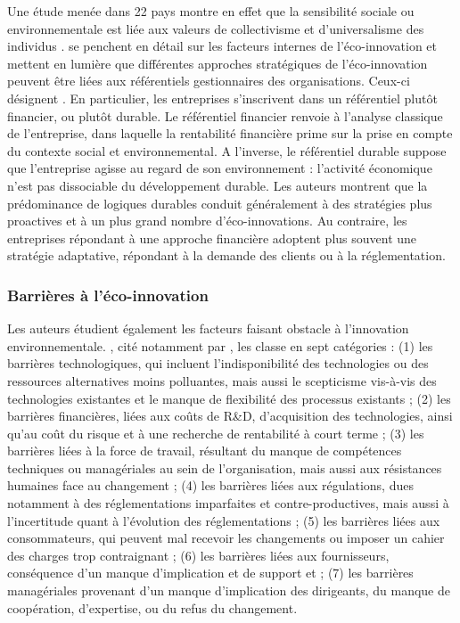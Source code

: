             Une étude menée dans 22 pays montre en effet que la sensibilité sociale ou environnementale est liée aux valeurs de collectivisme et d'universalisme des individus \parencite{reynaud2008les}. \textcite{mathieu2015les} se penchent en détail sur les facteurs internes de l'éco-innovation et mettent en lumière que différentes approches stratégiques de l'éco-innovation peuvent être liées aux référentiels gestionnaires des organisations. Ceux-ci désignent  \parencite{martinet2004entreprise}. En particulier, les entreprises s'inscrivent dans un référentiel plutôt financier, ou plutôt durable. Le référentiel financier renvoie à l'analyse classique de l'entreprise, dans laquelle la rentabilité financière prime sur la prise en compte du contexte social et environnemental. A l'inverse, le référentiel durable suppose que l'entreprise agisse au regard de son environnement : l'activité économique n'est pas dissociable du développement durable. Les auteurs montrent que la prédominance de logiques durables conduit généralement à des stratégies plus proactives et à un plus grand nombre d'éco-innovations. Au contraire, les entreprises répondant à une approche financière adoptent plus souvent une stratégie adaptative, répondant à la demande des clients ou à la réglementation. \\


        \subsubsection{Barrières à l'éco-innovation}

            Les auteurs étudient également les facteurs faisant obstacle à l'innovation environnementale. \textcite{ashford1993understanding}, cité notamment par \textcite{arundel2009measuring}, les classe en sept catégories : (1) les barrières technologiques, qui incluent l'indisponibilité des technologies ou des ressources alternatives moins polluantes, mais aussi le scepticisme vis-à-vis des technologies existantes et le manque de flexibilité des processus existants ; (2) les barrières financières, liées aux coûts de R\&D, d'acquisition des technologies, ainsi qu'au coût du risque et à une recherche de rentabilité à court terme ; (3) les barrières liées à la force de travail, résultant du manque de compétences techniques ou managériales au sein de l'organisation, mais aussi aux résistances humaines face au changement ; (4) les barrières liées aux régulations, dues notamment à des réglementations imparfaites et contre-productives, mais aussi à l'incertitude quant à l'évolution des réglementations ; (5) les barrières liées aux consommateurs, qui peuvent mal recevoir les changements ou imposer un cahier des charges trop contraignant ; (6) les barrières liées aux fournisseurs, conséquence d'un manque d'implication et de support et ; (7) les barrières managériales provenant d'un manque d'implication des dirigeants, du manque de coopération, d'expertise, ou du refus du changement. \\

